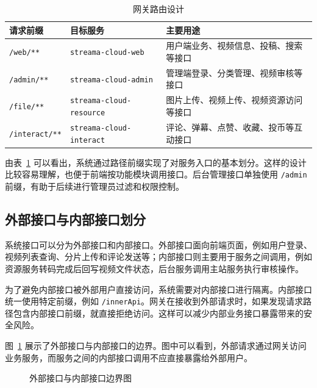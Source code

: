 \begin{table}[htbp]
  \centering
  \caption{网关路由设计}
  \label{tab:gateway-route}
  \begin{tabular}{p{}p{}p{}}
    \hline
    \textbf{请求前缀} & \textbf{目标服务} & \textbf{主要用途} \\
    \hline
    \texttt{/web/**} & \texttt{streama-cloud-web} & 用户端业务、视频信息、投稿、搜索等接口 \\
    \texttt{/admin/**} & \texttt{streama-cloud-admin} & 管理端登录、分类管理、视频审核等接口 \\
    \texttt{/file/**} & \texttt{streama-cloud-resource} & 图片上传、视频上传、视频资源访问等接口 \\
    \texttt{/interact/**} & \texttt{streama-cloud-interact} & 评论、弹幕、点赞、收藏、投币等互动接口 \\
    \hline
  \end{tabular}
\end{table}

由表~\ref{tab:gateway-route} 可以看出，系统通过路径前缀实现了对服务入口的基本划分。这样的设计比较容易理解，也便于前端按功能模块调用接口。后台管理接口单独使用 \texttt{/admin} 前缀，有助于后续进行管理员过滤和权限控制。

\subsection{外部接口与内部接口划分}
\label{subsec:external-inner-interface}

系统接口可以分为外部接口和内部接口。外部接口面向前端页面，例如用户登录、视频列表查询、分片上传和评论发送等；内部接口则主要用于服务之间调用，例如资源服务转码完成后回写视频文件状态，后台服务调用主站服务执行审核操作。

为了避免内部接口被外部用户直接访问，系统需要对内部接口进行隔离。内部接口统一使用特定前缀，例如 \texttt{/innerApi}。网关在接收到外部请求时，如果发现请求路径包含内部接口前缀，就直接拒绝访问。这样可以减少内部业务接口暴露带来的安全风险。

图~\ref{fig:interface-boundary} 展示了外部接口与内部接口的边界。图中可以看到，外部请求通过网关访问业务服务，而服务之间的内部接口调用不应直接暴露给外部用户。

\begin{figure}[htbp]
  \centering
  \caption{外部接口与内部接口边界图}
  \label{fig:interface-boundary}
\end{figure}

